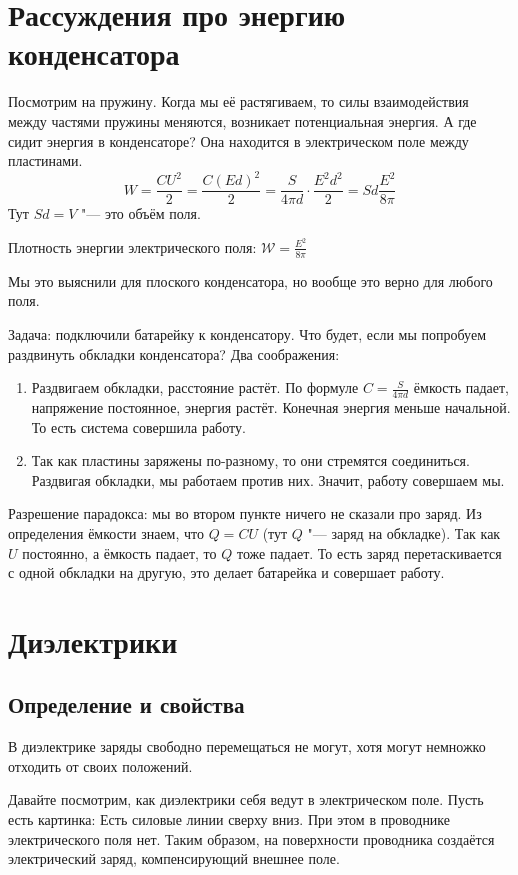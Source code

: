 
\section{Рассуждения про энергию конденсатора}
	Посмотрим на пружину.
	Когда мы её растягиваем, то силы взаимодействия между частями пружины
	меняются, возникает потенциальная энергия.
	А где сидит энергия в конденсаторе?
	Она находится в электрическом поле между пластинами.
	\[ W = \frac{CU^2}2 = \frac{C(Ed)^2}2 = \frac{S}{4\pi d}\cdot\frac{E^2d^2}{2} = Sd \frac{E^2}{8\pi} \]
	Тут $Sd=V$ "--- это объём поля. 
	\begin{Def}
		Плотность энергии электрического поля: $\mathcal{W} = \frac{E^2}{8\pi}$
	\end{Def}
	\begin{Rem}
		Мы это выяснили для плоского конденсатора, но вообще это верно для любого поля.
	\end{Rem}

	Задача: подключили батарейку к конденсатору.
	Что будет, если мы попробуем раздвинуть обкладки конденсатора?
	Два соображения:
	\begin{enumerate}
	\item
		Раздвигаем обкладки, расстояние растёт.
		По формуле $C=\frac{S}{4\pi d}$ ёмкость падает, напряжение постоянное, энергия растёт.
		Конечная энергия меньше начальной.
		То есть система совершила работу.
	\item
		Так как пластины заряжены по-разному, то они стремятся соединиться.
		Раздвигая обкладки, мы работаем против них.
		Значит, работу совершаем мы.
	\end{enumerate}
	Разрешение парадокса: мы во втором пункте ничего не сказали про заряд.
	Из определения ёмкости знаем, что $Q=CU$ (тут $Q$ "--- заряд на обкладке).
	Так как $U$ постоянно, а ёмкость падает, то $Q$ тоже падает.
	То есть заряд перетаскивается с одной обкладки на другую, это делает батарейка и совершает работу.

\section{Диэлектрики}
	\subsection{Определение и свойства}
		\begin{Def}
			В диэлектрике заряды свободно перемещаться не могут, хотя могут немножко отходить от своих положений.
		\end{Def}
		Давайте посмотрим, как диэлектрики себя ведут в электрическом поле.
		Пусть есть картинка:
		Есть силовые линии сверху вниз.
		При этом в проводнике электрического поля нет.
		Таким образом, на поверхности проводника создаётся электрический заряд, компенсирующий внешнее поле.

